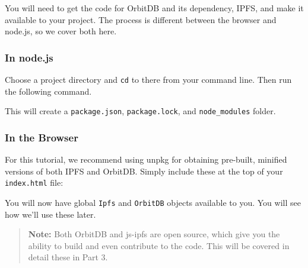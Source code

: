 You will need to get the code for OrbitDB and its dependency, IPFS, and
make it available to your project. The process is different between the
browser and node.js, so we cover both here.

\subsubsection{In node.js}\label{in-node.js}

Choose a project directory and \texttt{cd} to there from your command
line. Then run the following command.

\begin{Shaded}
\begin{Highlighting}[]
\NormalTok{$ }

\NormalTok{$ }
\end{Highlighting}
\end{Shaded}

This will create a \texttt{package.json}, \texttt{package.lock}, and
\texttt{node\_modules} folder.

\subsubsection{In the Browser}\label{in-the-browser}

For this tutorial, we recommend using unpkg for obtaining pre-built,
minified versions of both IPFS and OrbitDB. Simply include these at the
top of your \texttt{index.html} file:

\begin{Shaded}
\begin{Highlighting}[]
\end{Highlighting}
\end{Shaded}

You will now have global \texttt{Ipfs} and \texttt{OrbitDB} objects
available to you. You will see how we'll use these later.

\begin{quote}
\textbf{Note:} Both OrbitDB and js-ipfs are open source, which give you
the ability to build and even contribute to the code. This will be
covered in detail these in Part 3.
\end{quote}

